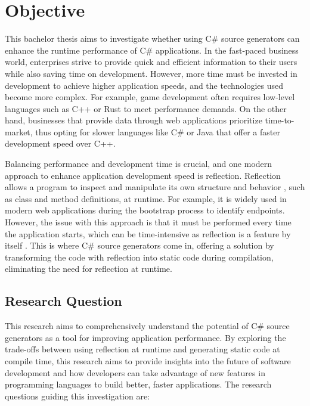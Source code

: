 \chapter{Objective}

This bachelor thesis aims to investigate whether using C\# source generators can enhance the runtime performance of C\# applications. In the fast-paced business world, enterprises strive to provide quick and efficient information to their users while also saving time on development. However, more time must be invested in development to achieve higher application speeds, and the technologies used become more complex. For example, game development often requires low-level languages such as C++ or Rust to meet performance demands. On the other hand, businesses that provide data through web applications prioritize time-to-market, thus opting for slower languages like C\# or Java that offer a faster development speed over C++.

Balancing performance and development time is crucial, and one modern approach to enhance application development speed is reflection. Reflection allows a program to inspect and manipulate its own structure and behavior \cite{Draheim2005GenerativeC}, such as class and method definitions, at runtime. For example, it is widely used in modern web applications during the bootstrap process to identify endpoints. However, the issue with this approach is that it must be performed every time the application starts, which can be time-intensive as reflection is a feature by itself \cite{Dragan2005PerformanceComputing}. This is where C\# source generators come in, offering a solution by transforming the code with reflection into static code during compilation, eliminating the need for reflection at runtime.

\section{Research Question}

This research aims to comprehensively understand the potential of C\# source generators as a tool for improving application performance. By exploring the trade-offs between using reflection at runtime and generating static code at compile time, this research aims to provide insights into the future of software development and how developers can take advantage of new features in programming languages to build better, faster applications. The research questions guiding this investigation are:

